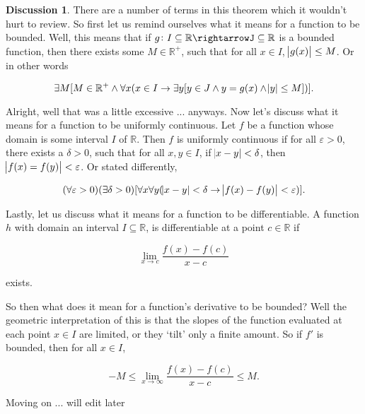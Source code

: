 \documentclass{article}
\theoremstyle{definition}
\theoremstyle{remark}
\theoremstyle{definition}
\newtheorem*{discussion}{Discussion}
\begin{document}
\begin{discussion}
    There are a number of terms in this theorem which it wouldn't hurt to review. So first let us remind ourselves what it means for a function to be bounded. Well, this means that if $g\colon I\subseteq\mathbb{R}\rightarrowJ\subseteq\mathbb{R}$ is a bounded function, then there exists some $M\in\mathbb{R}^+$, such that for all $x\in I$, $\abs{g(x)}\leq M$. Or in other words
    
    \begin{equation*}
        \exists M[M\in\mathbb{R}^+\wedge\forall x(x\in I\rightarrow\exists y[y\in J\wedge y=g(x)\wedge \abs{y}\leq M])].
    \end{equation*}
    
    \noindent Alright, well that was a little excessive ... anyways. Now let's discuss what it means for a function to be uniformly continuous. Let $f$ be a function whose domain is some interval $I$ of $\mathbb{R}$. Then $f$ is uniformly continuous if for all $\varepsilon>0$, there exists a $\delta>0$, such that for all $x,y\in I$, if $\abs{x-y}<\delta$, then $\abs{f(x)=f(y)}<\varepsilon$.
    Or stated differently,
    
    \begin{equation*}
        (\forall\varepsilon>0)(\exists\delta>0)[\forall x\forall y(\abs{x-y}<\delta\rightarrow\abs{f(x)-f(y)}<\varepsilon)].
    \end{equation*}
    
    \noindent Lastly, let us discuss what it means for a function to be differentiable. A function $h$ with domain an interval $I\subseteq\mathbb{R}$, is differentiable at a point $c\in\mathbb{R}$ if
    
    \begin{equation*}
        \lim_{x\rightarrow c}\frac{f(x)-f(c)}{x-c}
    \end{equation*}
    
    \noindent exists.
    
    \noindent\par 
    So then what does it mean for a function's derivative to be bounded? Well the geometric interpretation of this is that the slopes of the function evaluated at each point $x\in I$ are limited, or they `tilt' only a finite amount. So if $f'$ is bounded, then for all $x\in I$,
    
    \begin{equation*}
        -M\leq\lim_{x\rightarrow\infty}\frac{f(x)-f(c)}{x-c}\leq M.
    \end{equation*}
    
    \noindent Moving on ... will edit later
\end{discussion}
\end{document}
